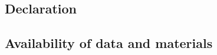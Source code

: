 \documentclass[doublespacing]{bmcart}
\begin{document}
\begin{CJK*}{UTF8}{gbsn}
\begin{frontmatter}
\begin{abstractbox}
\begin{keyword}
\end{keyword}

 
\end{abstractbox} 

\end{frontmatter}




\renewcommand\thesection{\Roman{section}}
\renewcommand\thesubsection{\Roman{section}.\alph{subsection}}

\paragraph{}

\begin{center}
	\section*{Declaration}
	\subsection*{Availability of data and materials}
\end{center}

\end{CJK*}
\end{document}

